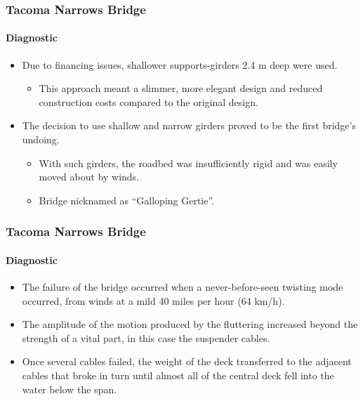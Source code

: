 \begin{frame}
\frametitle{Tacoma Narrows Bridge}
\framesubtitle{Diagnostic}

\begin{itemize}
	\item Due to financing issues, shallower supports-girders 2.4 m deep were
	used.
	\begin{itemize}
		\item This approach meant a slimmer, more elegant design and reduced
		construction costs compared to the original design.
	\end{itemize}

	\item The decision to use shallow and narrow girders proved to be the first
	bridge's undoing.
	\begin{itemize}
		\item With such girders, the roadbed was insufficiently rigid and was
		easily moved about by winds.

		\item Bridge nicknamed as ``Galloping Gertie''.
	\end{itemize}
\end{itemize}
\end{frame}


\begin{frame}
\frametitle{Tacoma Narrows Bridge}
\framesubtitle{Diagnostic}

\begin{itemize}
	\item The failure of the bridge occurred when a never-before-seen twisting
	mode occurred, from winds at a mild 40 miles per hour (64 km/h).

	\item The amplitude of the motion produced by the fluttering increased
	beyond the strength of a vital part, in this case the suspender cables.

	\item Once several cables failed, the weight of the deck transferred to
	the adjacent cables that broke in turn until almost all of the central deck
	fell into the water below the span.
\end{itemize}
\end{frame}



